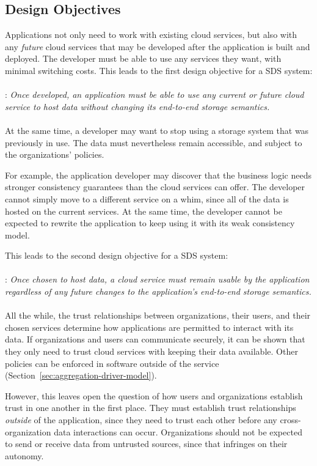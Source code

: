 \subsection{Design Objectives}

Applications not only need to work with existing cloud services, but also with
any \emph{future} cloud services that may be developed after the application is
built and deployed.  The developer must be able to use any services they want,
with minimal switching costs.  This leads to the first design objective for a SDS
system:
\\
\\
: \emph{Once developed, an application must be
able to use any current or future 
cloud service to host data without changing its end-to-end storage semantics.}
\\
\\
At the same time, a developer may want to stop using a storage system that was
previously in use.  The data must nevertheless remain accessible, and subject to
the organizations' policies.

For example, the application developer may discover that the business logic needs stronger
consistency guarantees than the cloud services can offer.  The developer cannot
simply move to a different service on a whim, since all of the data is hosted 
on the current services.  At the same time, the developer cannot be expected
to rewrite the application to keep using it with its weak consistency model.

This leads to the second design objective for a SDS system:
\\
\\
: \emph{Once chosen to host data, a cloud service
must remain usable by the application regardless of any future changes to the
application's end-to-end storage semantics.}
\\
\\
All the while, the trust relationships between organizations, their users, and
their chosen services determine how applications are permitted to
interact with its data.  If organizations and users can communicate securely,
it can be shown that they only need to trust cloud services with
keeping their data available.  Other policies can be enforced
in software outside of the service (Section~\ref{sec:aggregation-driver-model}).

However, this leaves open the question of how users and
organizations establish trust in one another in the first place.  They must
establish trust relationships \emph{outside} of the application, since they need
to trust each other before any cross-organization data interactions can occur.  Organizations should
not be expected to send or receive data from untrusted sources, since that
infringes on their autonomy.

